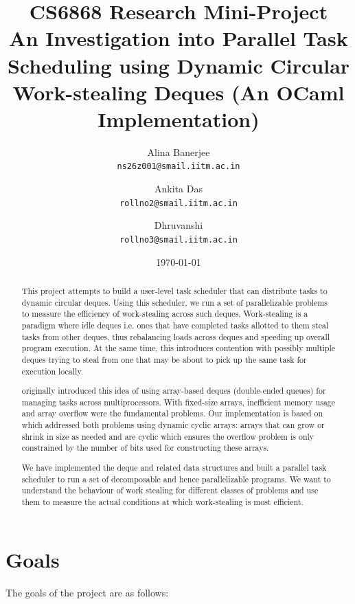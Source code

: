 \documentclass[11pt,a4paper]{article}
\title{%
  \textbf{CS6868 Research Mini-Project} \\[0.3em]
  \Large An Investigation into Parallel Task Scheduling using Dynamic
  Circular Work-stealing Deques (An OCaml Implementation)
}
\author{%
  Alina Banerjee \\ \texttt{ns26z001@smail.iitm.ac.in}
  \and
  Ankita Das \\ \texttt{rollno2@smail.iitm.ac.in}
  \and
  Dhruvanshi \\ \texttt{rollno3@smail.iitm.ac.in}
}
\date{\today}
\begin{document}
\maketitle

\begin{abstract}

This project attempts to build a user-level task scheduler that can distribute
tasks to dynamic circular deques. Using this scheduler, we run a set of parallelizable
problems to measure
the efficiency of work-stealing across such deques. Work-stealing is a paradigm
where idle deques i.e. ones that have completed tasks allotted to them steal
tasks from other deques, thus rebalancing loads across deques and speeding up
overall program execution. At the same time, this introduces contention with
possibly multiple deques trying to steal from one that may be about to pick up
the same task for execution locally.

\cite{arora1998thread} originally introduced this idea of using array-based
deques (double-ended queues) for managing tasks across multiprocessors.
With fixed-size arrays, inefficient memory usage and array overflow were the
fundamental problems. Our
implementation is based on \cite{chase2005dynamic} which addressed both problems
using dynamic cyclic arrays: arrays that can grow or shrink in size as needed and
are cyclic which ensures the overflow problem is only constrained by the number
of bits used for constructing these arrays.

We have implemented the deque and related data structures and built a parallel task
scheduler to run a set of decomposable and hence parallelizable programs. We
want to understand the behaviour of work stealing for different classes of
problems and use them to measure the actual conditions at which work-stealing
is most efficient.

\end{abstract}

\section{Goals}
\label{sec:goals}

The goals of the project are as follows:
\end{document}
